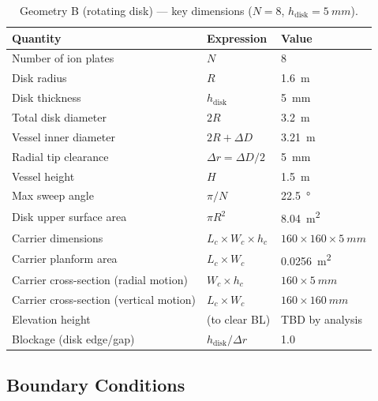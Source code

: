 \documentclass[11pt,a4paper]{article}
\begin{document}
\begin{table}[H]
\centering
\caption{Geometry B (rotating disk) — key dimensions ($N = 8$,
$h_\mathrm{disk} = \SI{5}{mm}$).}
\label{tab:geomB}
\begin{tabular}{lll}
\toprule
Quantity & Expression & Value \\
\midrule
Number of ion plates   & $N$                           & 8 \\
Disk radius            & $R$                           & \SI{1.6}{m} \\
Disk thickness         & $h_\mathrm{disk}$             & \SI{5}{mm} \\
Total disk diameter    & $2R$                          & \SI{3.2}{m} \\
Vessel inner diameter  & $2R + \Delta D$               & \SI{3.21}{m} \\
Radial tip clearance   & $\Delta r = \Delta D/2$       & \SI{5}{mm} \\
Vessel height          & $H$                           & \SI{1.5}{m} \\
Max sweep angle        & $\pi / N$                     & \SI{22.5}{\degree} \\
Disk upper surface area & $\pi R^2$                    & \SI{8.04}{m^2} \\
Carrier dimensions     & $L_c \times W_c \times h_c$   & $160\times160\times\SI{5}{mm}$ \\
Carrier planform area  & $L_c \times W_c$              & \SI{0.0256}{m^2} \\
Carrier cross-section (radial motion) & $W_c \times h_c$
                                                        & $160\times\SI{5}{mm}$ \\
Carrier cross-section (vertical motion) & $L_c \times W_c$
                                                        & $160\times\SI{160}{mm}$ \\
Elevation height       & (to clear BL)                 & TBD by analysis \\
Blockage (disk edge/gap) & $h_\mathrm{disk}/\Delta r$  & 1.0 \\
\bottomrule
\end{tabular}
\end{table}

\subsection{Boundary Conditions}
\end{document}
